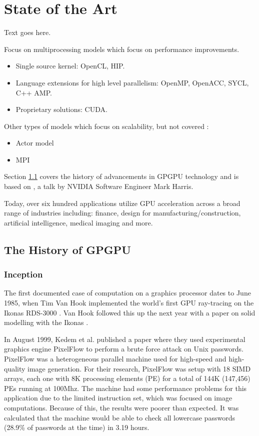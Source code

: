 \chapter{State of the Art} \label{ch:StateOfTheArt}

Text goes here.

Focus on multiprocessing models which focus on performance improvements.

\begin{itemize}
    \item Single source kernel: OpenCL, HIP.
    \item Language extensions for high level parallelism: OpenMP, OpenACC, SYCL, C++ AMP.
    \item Proprietary solutions: CUDA.
\end{itemize}

Other types of models which focus on scalability, but not covered \cite{survey_programming_models}:

\begin{itemize}
    \item Actor model
    \item MPI
\end{itemize}

Section \ref{sect:history-gpgpu} covers the history of advancements in GPGPU technology and is based on \cite{brief_history_gpgpu}, a talk by NVIDIA Software Engineer Mark Harris.

Today, over six hundred applications utilize GPU acceleration across a broad range of industries including: finance, design for manufacturing/construction, artificial intelligence, medical imaging and more.

\section{The History of GPGPU} \label{sect:history-gpgpu}

\subsection{Inception}
The first documented case of computation on a graphics processor dates to June 1985, when Tim Van Hook implemented the world's first GPU ray-tracing on the Ikonas RDS-3000 \cite{ikonas}. Van Hook followed this up the next year with a paper on solid modelling with the Ikonas \cite{solid_modeling_ikonas}.

In August 1999, Kedem et al. \cite{unix_passwords_gpgpu} published a paper where they used experimental graphics engine PixelFlow to perform a brute force attack on Unix passwords. PixelFlow was a heterogeneous parallel machine used for high-speed and high-quality image generation. For their research, PixelFlow was setup with 18 SIMD arrays, each one with 8K processing elements (PE) for a total of 144K (147,456) PEs running at 100Mhz. The machine had some performance problems for this application due to the limited instruction set, which was focused on image computations. Because of this, the results were poorer than expected. It was calculated that the machine would be able to check all lowercase passwords (28.9\% of passwords at the time) in 3.19 hours.

